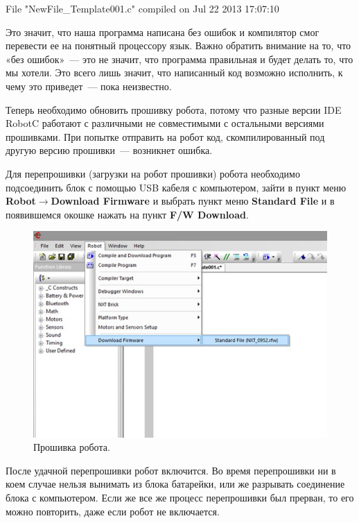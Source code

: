 \begin{center}
	File "NewFile\_Template001.c" compiled on Jul 22 2013 17:07:10 
\end{center}

Это значит, что наша программа написана без ошибок и компилятор смог перевести ее на понятный процессору язык. Важно обратить внимание на то, что «без ошибок»~--- это не значит, что программа правильная и  будет делать то, что мы хотели. Это всего лишь значит, что написанный код возможно исполнить, к чему это приведет~--- пока неизвестно.

Теперь необходимо обновить прошивку робота, потому что разные версии IDE RobotC работают с различными не совместимыми с остальными версиями прошивками. При попытке отправить на робот код, скомпилированный под другую версию прошивки~--- возникнет ошибка.

Для перепрошивки (загрузки на робот прошивки) робота необходимо подсоединить блок с помощью USB кабеля с компьютером, зайти в пункт меню {\bfseries Robot\(\to\)Download Firmware} и выбрать пункт меню {\bfseries Standard File} и в появившемся окошке нажать на пункт {\bfseries F/W Download}.

\begin{figure}[h!]
	\begin{center}
		\includegraphics[width=1\linewidth]{chapters/chapter9/images/4}
		\caption{Прошивка робота.}
		\label{ris:image9x4}
	\end{center}
\end{figure}

После удачной перепрошивки робот включится. Во время перепрошивки ни в коем случае нельзя вынимать из блока батарейки, или же разрывать соединение блока с компьютером. Если же все же процесс перепрошивки был прерван, то его можно повторить, даже если робот не включается.

